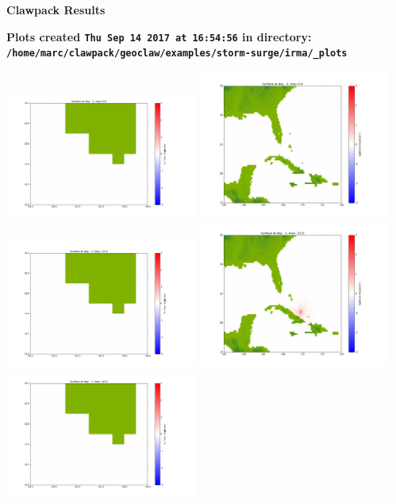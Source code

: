 \documentclass[11pt]{article}
\begin{document}
        \begin{center}{\Large\bf Clawpack Results}\vskip 5pt
        
        \bf Plots created {\tt Thu Sep 14 2017 at 16:54:56} in directory: \vskip 5pt
        \verb+/home/marc/clawpack/geoclaw/examples/storm-surge/irma/_plots+
        \end{center}
        \vskip 5pt
        \includegraphics[width=0.475\textwidth]{frame0000fig1001.png}
\includegraphics[width=0.475\textwidth]{frame0000fig1002.png}
\vskip 10pt 
\includegraphics[width=0.475\textwidth]{frame0001fig1001.png}
\includegraphics[width=0.475\textwidth]{frame0001fig1002.png}
\vskip 10pt 
\includegraphics[width=0.475\textwidth]{frame0002fig1001.png}
\end{document}
